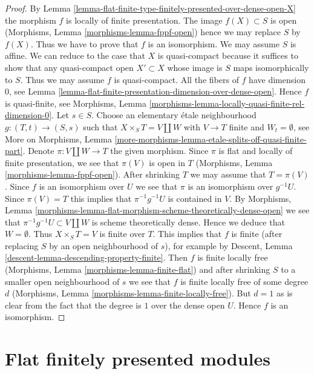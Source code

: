 \begin{proof}
By Lemma \ref{lemma-flat-finite-type-finitely-presented-over-dense-open-X}
the morphism $f$ is locally of finite presentation.
The image $f(X) \subset S$ is open
(Morphisms, Lemma \ref{morphisms-lemma-fppf-open})
hence we may replace $S$ by $f(X)$. Thus we have to prove that
$f$ is an isomorphism. We may assume $S$ is affine. We can reduce
to the case that $X$ is quasi-compact because it suffices to show
that any quasi-compact open $X' \subset X$ whose image is $S$
maps isomorphically to $S$. Thus we may assume $f$ is quasi-compact.
All the fibers of $f$ have dimension $0$, see
Lemma \ref{lemma-flat-finite-presentation-dimension-over-dense-open}.
Hence $f$ is quasi-finite, see
Morphisms, Lemma \ref{morphisms-lemma-locally-quasi-finite-rel-dimension-0}.
Let $s \in S$. Choose an elementary \'etale
neighbourhood $g : (T, t) \to (S, s)$ such that $X \times_S T = V \amalg W$
with $V \to T$ finite and $W_t = \emptyset$, see
More on Morphisms, Lemma
\ref{more-morphisms-lemma-etale-splits-off-quasi-finite-part}.
Denote $\pi : V \amalg W \to T$ the given morphism. Since $\pi$ is
flat and locally of finite presentation, we see that $\pi(V)$ is
open in $T$ (Morphisms, Lemma \ref{morphisms-lemma-fppf-open}).
After shrinking $T$ we may assume that $T = \pi(V)$.
Since $f$ is an isomorphism over $U$ we see that $\pi$ is an
isomorphism over $g^{-1}U$. Since $\pi(V) = T$ this implies
that $\pi^{-1}g^{-1}U$ is contained in $V$. 
By Morphisms, Lemma
\ref{morphisms-lemma-flat-morphism-scheme-theoretically-dense-open}
we see that $\pi^{-1}g^{-1}U \subset V \amalg W$ is scheme theoretically
dense. Hence we deduce that $W = \emptyset$.
Thus $X \times_S T = V$ is finite over $T$.
This implies that $f$ is finite (after replacing $S$ by an
open neighbourhood of $s$), for example by
Descent, Lemma \ref{descent-lemma-descending-property-finite}.
Then $f$ is finite locally free
(Morphisms, Lemma \ref{morphisms-lemma-finite-flat})
and after shrinking $S$ to a smaller open neighbourhood of $s$
we see that $f$ is finite locally free of some degree $d$
(Morphisms, Lemma \ref{morphisms-lemma-finite-locally-free}).
But $d = 1$ as is clear from the fact that the degree is $1$ over
the dense open $U$. Hence $f$ is an isomorphism.
\end{proof}





\section{Flat finitely presented modules}
\label{section-finitely-presented-flat}

